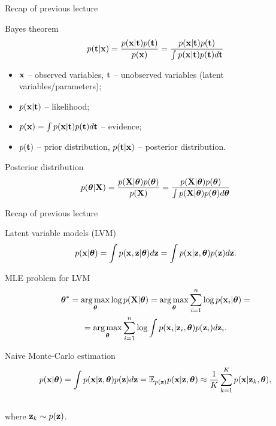 \begin{frame}{Recap of previous lecture}
	\begin{block}{Bayes theorem}
		\[
			p(\mathbf{t} | \mathbf{x}) = \frac{p(\mathbf{x} | \mathbf{t}) p(\mathbf{t})}{p(\mathbf{x})} = \frac{p(\mathbf{x} | \mathbf{t}) p(\mathbf{t})}{\int p(\mathbf{x} | \mathbf{t}) p(\mathbf{t}) d \mathbf{t}} 
		\]
		\begin{itemize}
			\item $\mathbf{x}$ -- observed variables, $\mathbf{t}$ -- unobserved variables (latent variables/parameters);
			\item $p(\mathbf{x} | \mathbf{t})$ -- likelihood;
			\item $p(\mathbf{x}) = \int p(\mathbf{x} | \mathbf{t}) p(\mathbf{t}) d \mathbf{t}$ -- evidence;
			\item $p(\mathbf{t})$ -- prior distribution, $p(\mathbf{t} | \mathbf{x})$ -- posterior distribution.
		\end{itemize}
	\end{block}
	\begin{block}{Posterior distribution}
		\[
		p(\boldsymbol{\theta} | \mathbf{X}) = \frac{p(\mathbf{X} | \boldsymbol{\theta}) p(\boldsymbol{\theta})}{p(\mathbf{X})} = \frac{p(\mathbf{X} | \boldsymbol{\theta}) p(\boldsymbol{\theta})}{\int p(\mathbf{X} | \boldsymbol{\theta}) p(\boldsymbol{\theta}) d \boldsymbol{\theta}} 
		\]
		\vspace{-0.2cm}
	\end{block}
\end{frame}
\begin{frame}{Recap of previous lecture}
	\begin{block}{Latent variable models (LVM)}
		\vspace{-0.3cm}
		\[
		p(\mathbf{x} | \boldsymbol{\theta}) = \int p(\mathbf{x}, \mathbf{z} | \boldsymbol{\theta}) d\mathbf{z} = \int p(\mathbf{x} | \mathbf{z}, \boldsymbol{\theta}) p(\mathbf{z}) d\mathbf{z}.
		\]
	\end{block}
	\begin{block}{MLE problem for LVM}
		\vspace{-0.7cm}
		\begin{multline*}
			\boldsymbol{\theta}^* = \operatorname*{arg\,max}_{\boldsymbol{\theta}} \log p(\mathbf{X}| \boldsymbol{\theta}) = \operatorname*{arg\,max}_{\boldsymbol{\theta}} \sum_{i=1}^n \log p(\mathbf{x}_i | \boldsymbol{\theta}) = \\ = \operatorname*{arg\,max}_{\boldsymbol{\theta}}  \sum_{i=1}^n \log \int p(\mathbf{x}_i| \mathbf{z}_i, \boldsymbol{\theta}) p(\mathbf{z}_i) d\mathbf{z}_i.
		\end{multline*}
		\vspace{-0.7cm}
	\end{block}
	\begin{block}{Naive Monte-Carlo estimation}
		\vspace{-0.7cm}
		\[
		p(\mathbf{x} | \boldsymbol{\theta}) = \int p(\mathbf{x} | \mathbf{z}, \boldsymbol{\theta}) p(\mathbf{z}) d\mathbf{z} = \mathbb{E}_{p(\mathbf{z})} p(\mathbf{x} | \mathbf{z}, \boldsymbol{\theta}) \approx \frac{1}{K} \sum_{k=1}^{K} p(\mathbf{x} | \mathbf{z}_k, \boldsymbol{\theta}),
		\]
		\vspace{-0.5cm} \\
		where $\mathbf{z}_k \sim p(\mathbf{z})$. 
	\end{block}
\end{frame}
